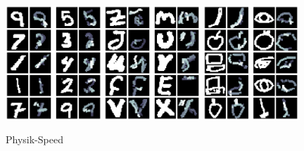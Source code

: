\begin{figure}[!ht]
    \centering
    \includegraphics[width=0.32\textwidth]{images/resultate/physics-speed-mnist.png}
    \includegraphics[width=0.32\textwidth]{images/resultate/physics-speed-emnist.png}
    \includegraphics[width=0.32\textwidth]{images/resultate/physics-speed-quickdraw.png}
    \caption{Physik-Speed}
    \label{fig:Physik-Speed}
\end{figure}

